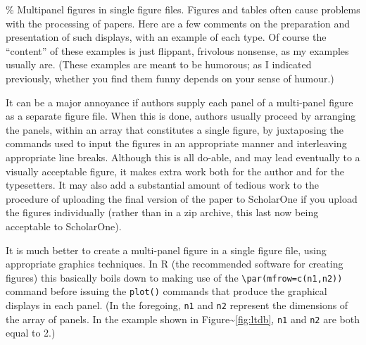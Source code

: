 \documentclass[
  times,
  doublespace]{anzsauth}
\begin{document}
\% Multipanel figures in single figure files. Figures and tables often
cause problems with the processing of papers. Here are a few comments on
the preparation and presentation of such displays, with an example of
each type. Of course the ``content'' of these examples is just flippant,
frivolous nonsense, as my examples usually are. (These examples are
meant to be humorous; as I indicated previously, whether you find them
funny depends on your sense of humour.)

It can be a major annoyance if authors supply each panel of a
multi-panel figure as a separate figure file. When this is done, authors
usually proceed by arranging the panels, within an array that
constitutes a single figure, by juxtaposing the commands used to input
the figures in an appropriate manner and interleaving appropriate line
breaks. Although this is all do-able, and may lead eventually to a
visually acceptable figure, it makes extra work both for the author and
for the typesetters. It may also add a substantial amount of tedious
work to the procedure of uploading the final version of the paper to
ScholarOne if you upload the figures individually (rather than in a zip
archive, this last now being acceptable to ScholarOne).

It is much better to create a multi-panel figure in a single figure
file, using appropriate graphics techniques. In \textsf{R} (the
recommended software for creating figures) this basically boils down to
making use of the \texttt{\textbackslash{}par(mfrow=c(n1,n2))} command
before issuing the \texttt{plot()} commands that produce the graphical
displays in each panel. (In the foregoing, \texttt{n1} and \texttt{n2}
represent the dimensions of the array of panels. In the example shown in
Figure\textasciitilde{}\ref{fig:ltdb}, \texttt{n1} and \texttt{n2} are
both equal to 2.)
\end{document}
